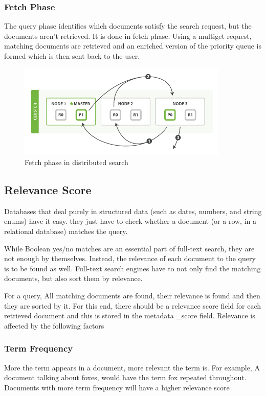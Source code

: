 \documentclass[12pt]{article}
\begin{document}
			\subsubsection{Fetch Phase}
			The query phase identifies which documents satisfy the search request, but the documents aren't retrieved. It is done in fetch phase. Using a multiget request, matching documents are retrieved and an enriched version of the priority queue is formed which is then sent back to the user.
				\begin{figure}[ht]
					\centering\includegraphics[width=10cm]{images/fetch_phase}
					\caption{Fetch phase in distributed search}
				\end{figure}

		\subsection{Relevance Score}
			Databases that deal purely in structured data (such as dates, numbers, and string
			enums) have it easy. they just have to check whether a document (or a row, in a relational database) matches the query.

			While Boolean yes/no matches are an essential part of full-text search, they are not
			enough by themselves. Instead, the relevance of each document to the query is to be found as well. Full-text search engines have to not only find the matching documents,
			but also sort them by relevance.

			For a query, All matching documents are found, their relevance is found and then they are sorted by it. For this end, there should be a relevance score field for each retrieved document and this is stored in the metadata \_score field. Relevance is affected by the following factors

			\subsubsection{Term Frequency}
				More the term appears in a document, more relevant the term is. For example, A document talking about foxes, would have the term fox repeated throughout. Documents with more term frequency will have a higher relevance score
\end{document}
